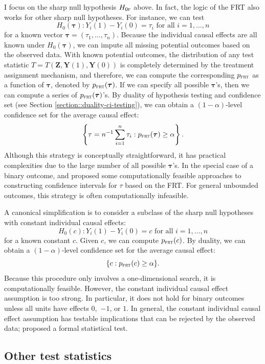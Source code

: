I focus on the sharp null hypothesis $H_{0\textsc{f}}$ above. In fact, the logic of the FRT also works for other sharp null hypotheses. For instance, we can test
$$
H_0(\bm{\tau}): Y_i(1) - Y_i(0) = \tau_i \text{ for all } i=1,\ldots, n
$$
for a known vector $\bm{\tau} = (\tau_1, \ldots, \tau_n)$. Because the individual causal effects are all known under $H_0(\bm{\tau})$, we can impute all missing potential outcomes based on the observed data. With known potential outcomes, the distribution of any test statistic $T = T(\bm{Z}, \bm{Y}(1), \bm{Y}(0))$ is completely determined by the treatment assignment mechanism, and therefore, we can compute the corresponding $p_{\textsc{frt}}$ as a function of $\bm{\tau} $, denoted by $p_{\textsc{frt}}(\bm{\tau} )$. If we can specify all possible $\bm{\tau}$'s, then we can compute a series of $p_{\textsc{frt}}(\bm{\tau} )$'s. By duality of hypothesis testing and confidence set (see Section \ref{section::duality-ci-testing}), we can obtain a $(1-\alpha)$-level confidence set for the average causal effect:
$$
\left \{ \tau = n^{-1}\sum_{i=1}^n \tau_i :  p_{\textsc{frt}}(\bm{\tau} ) \geq \alpha \right \} .
$$
Although this strategy is conceptually straightforward, it has practical complexities due to the large number of all possible $\bm{\tau}$'s. In the special case of a binary outcome, \citet{Rigdon:2015} and \citet{li2016exact} proposed some computationally feasible approaches to constructing confidence intervals for $\tau$ based on the FRT. For general unbounded outcomes, this strategy is often computationally infeasible. 


A canonical simplification \citep{rosenbaum2002design, Rosenbaum:2010} is to consider a subclass of the sharp null hypotheses with constant individual causal effects:
$$
H_0(c): Y_i(1) - Y_i(0) =  c\text{ for all } i=1,\ldots, n
$$
for a known constant $c$. Given $c$, we can compute $p_{\textsc{frt}}(c)$. By duality, we can obtain 
a $(1-\alpha)$-level confidence set for the average causal effect:
$$
\{ c :  p_{\textsc{frt}}(c ) \geq \alpha \} .
$$
Because this procedure only involves a one-dimensional search, it is computationally feasible. 
However, the constant individual causal effect assumption is too strong. In particular, it does not hold for binary outcomes unless all units have effects $0,$ $-1$, or $1$. In general, the constant individual causal effect assumption has testable implications that can be rejected by the observed data; \citet{ding2015randomization} proposed a formal statistical test. 



\subsection{Other test statistics}\label{section::other-statistic}


